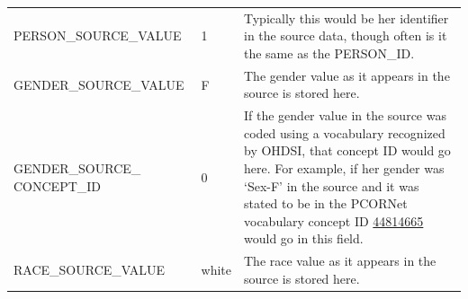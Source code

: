 \documentclass[11pt]{book}
\begin{document}
\begin{longtable}[]{@{}lll@{}}
\begin{minipage}[t]{0.33\columnwidth}\raggedright\strut
PERSON\_SOURCE\_VALUE\strut
\end{minipage} & \begin{minipage}[t]{0.16\columnwidth}\raggedright\strut
1\strut
\end{minipage} & \begin{minipage}[t]{0.42\columnwidth}\raggedright\strut
Typically this would be her identifier in the source data, though often
is it the same as the PERSON\_ID.\strut
\end{minipage}\tabularnewline
\begin{minipage}[t]{0.33\columnwidth}\raggedright\strut
GENDER\_SOURCE\_VALUE\strut
\end{minipage} & \begin{minipage}[t]{0.16\columnwidth}\raggedright\strut
F\strut
\end{minipage} & \begin{minipage}[t]{0.42\columnwidth}\raggedright\strut
The gender value as it appears in the source is stored here.\strut
\end{minipage}\tabularnewline
\begin{minipage}[t]{0.33\columnwidth}\raggedright\strut
GENDER\_SOURCE\_ CONCEPT\_ID\strut
\end{minipage} & \begin{minipage}[t]{0.16\columnwidth}\raggedright\strut
0\strut
\end{minipage} & \begin{minipage}[t]{0.42\columnwidth}\raggedright\strut
If the gender value in the source was coded using a vocabulary
recognized by OHDSI, that concept ID would go here. For example, if her
gender was `Sex-F' in the source and it was stated to be in the PCORNet
vocabulary concept ID
\href{http://athena.ohdsi.org/search-terms/terms/44814665}{44814665}
would go in this field.\strut
\end{minipage}\tabularnewline
\begin{minipage}[t]{0.33\columnwidth}\raggedright\strut
RACE\_SOURCE\_VALUE\strut
\end{minipage} & \begin{minipage}[t]{0.16\columnwidth}\raggedright\strut
white\strut
\end{minipage} & \begin{minipage}[t]{0.42\columnwidth}\raggedright\strut
The race value as it appears in the source is stored here.\strut
\end{minipage}\tabularnewline

\end{longtable}
\end{document}
